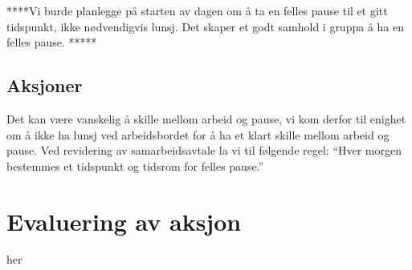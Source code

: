 ****Vi burde planlegge på starten av dagen om å ta en felles pause til et gitt tidspunkt, ikke nødvendigvis lunsj. Det skaper et godt samhold i gruppa å ha en felles pause.
*****

\subsection*{Aksjoner}
Det kan være vanskelig å skille mellom arbeid og pause, vi kom derfor til enighet om å ikke ha lunsj ved arbeidsbordet for å ha et klart skille mellom arbeid og pause. 
Ved revidering av samarbeidsavtale la vi til følgende regel:  ``Hver morgen bestemmes et tidspunkt og tidsrom for felles pause.''

\section{Evaluering av aksjon} 

her
